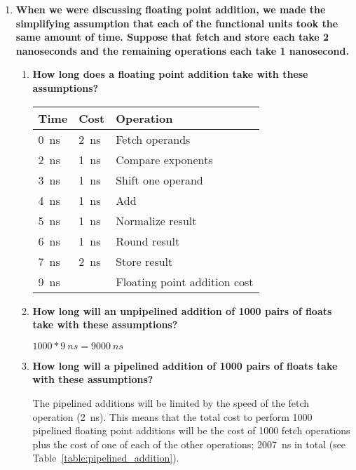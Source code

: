 \begin{enumerate}

\item \textbf{When we were discussing floating point addition, we made the simplifying assumption that each of the functional units took the same amount of time. Suppose that fetch and store each take 2 nanoseconds and the remaining operations each take 1 nanosecond.}

\begin{enumerate}
\item \textbf{How long does a floating point addition take with these assumptions?}

\begin{center}
\begin{tabular}{lll}
\hline
Time & Cost & Operation\\
\hline
0~ns & 2~ns & Fetch operands\\
2~ns & 1~ns & Compare exponents\\
3~ns & 1~ns & Shift one operand\\
4~ns & 1~ns & Add\\
5~ns & 1~ns & Normalize result\\
6~ns & 1~ns & Round result\\
7~ns & 2~ns & Store result\\
\hline
9~ns & & Floating point addition cost\\
\hline
\hline
\end{tabular}
\end{center}

\item \textbf{How long will an unpipelined addition of 1000 pairs of floats take with these assumptions?}

\begin{math}
1000 * \SI{9}{ns} = \SI{9000}{ns}
\end{math}

\item \textbf{How long will a pipelined addition of 1000 pairs of floats take with these assumptions?}

The pipelined additions will be limited by the speed of the fetch operation (\SI{2}{ns}). This means that the total cost to perform 1000 pipelined floating point additions will be the cost of 1000 fetch operations plus the cost of one of each of the other operations; \SI{2007}{ns} in total (see Table~\ref{table:pipelined_addition}).


\end{enumerate}
\end{enumerate}
